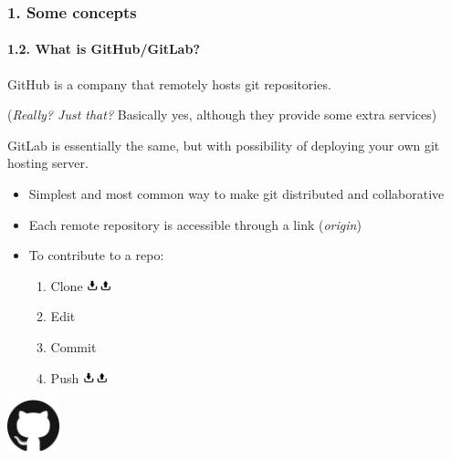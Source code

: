 \documentclass{beamer}
\begin{document}
\begin{frame}
\frametitle{1. Some concepts}
\framesubtitle{1.2. What is GitHub/GitLab?}

GitHub is a company that remotely hosts git repositories.

{\footnotesize (\textit{Really? Just that?} Basically yes, although they provide some extra services) }

\vspace{0.5em}

GitLab is essentially the same, but with possibility of deploying your own git hosting server.

\vspace{1em}

\begin{minipage}{0.60\textwidth}
  \begin{itemize}
    \item Simplest and most common way to make git distributed and collaborative
    \item Each remote repository is accessible through a link (\textit{origin})
    \item To contribute to a repo:
    \begin{enumerate}
      \item Clone \includegraphics[height=3mm]{img/upload-download}
      \item Edit
      \item Commit
      \item Push \includegraphics[height=3mm]{img/upload-download}
    \end{enumerate}
  \end{itemize}
\end{minipage}%
\begin{minipage}{0.40\textwidth}
  \centering
  \includegraphics[width=15mm]{img/GitHub-logo}\hspace{0.5em}
  
\end{minipage}

\end{frame}
\end{document}
